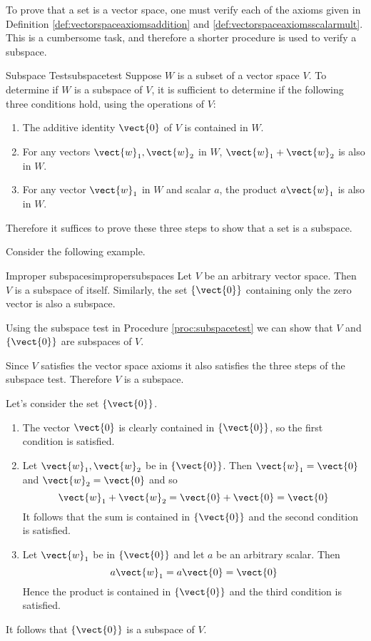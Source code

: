 To prove that a set is a vector space, one must verify each of the axioms given in Definition \ref{def:vectorspaceaxiomsaddition} and \ref{def:vectorspaceaxiomsscalarmult}. This is a cumbersome task, and therefore a shorter procedure is used to verify a subspace. 

\begin{procedure}{Subspace Test}{subspacetest}
Suppose $W$ is a subset of a vector space $V$. To determine if $W$ is a subspace of $V$, it is sufficient to determine if the following three conditions hold, using the operations of $V$: 
\begin{enumerate}
\item
The additive identity $\vect{0}$ of $V$ is contained in $W$.
\item
For any vectors $\vect{w}_1, \vect{w}_2$ in $W$, $\vect{w}_1 + \vect{w}_2$ is also in $W$.
\item
For any vector $\vect{w}_1$ in $W$ and scalar $a$,  the product $a\vect{w}_1$ is also in $W$. 
\end{enumerate}
\end{procedure}

Therefore it suffices to prove these three steps to show that a set is a subspace. 

Consider the following example.

\begin{example}{Improper subspaces}{impropersubspaces}
Let $V$ be an arbitrary vector space. Then $V$ is a subspace of itself. Similarly, the set $\left\{ \vect{0} \right\}$ containing only the zero vector is also a subspace. 
\end{example}

\begin{solution}
Using the subspace test in Procedure \ref{proc:subspacetest} we can show that $V$ and $\left\{ \vect{0} \right\}$ are subspaces of $V$. 

Since $V$ satisfies the vector space axioms it also satisfies the three steps of the subspace test. Therefore $V$ is a subspace.

Let's consider the set $\left\{ \vect{0} \right\}$. 
\begin{enumerate}
\item
The vector $\vect{0}$ is clearly contained in  $\left\{ \vect{0} \right\}$, so the first condition is satisfied.

\item
Let $\vect{w}_1, \vect{w}_2$ be in  $\left\{ \vect{0} \right\}$. Then $\vect{w}_1 = \vect{0}$ and $\vect{w}_2 = \vect{0}$ and so 
\[
\vect{w}_1 + \vect{w}_2 = \vect{0} + \vect{0} = \vect{0}
\]
It follows that the sum is contained in $\left\{ \vect{0} \right\}$ and the second condition is satisfied. 

\item
Let $\vect{w}_1$ be in  $\left\{ \vect{0} \right\}$ and let $a$ be an arbitrary scalar. Then
\[
a\vect{w}_1  = a\vect{0} = \vect{0}
\]
Hence the product is contained in  $\left\{ \vect{0} \right\}$ and the third condition is satisfied. 
\end{enumerate}

It follows that  $\left\{ \vect{0} \right\}$ is a subspace of $V$. 
\end{solution}

